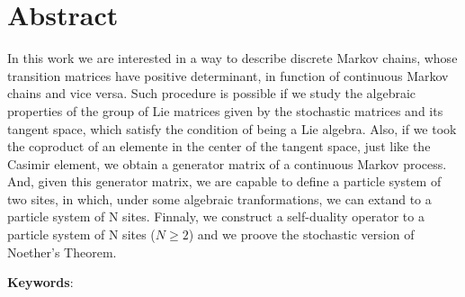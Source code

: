 \chapter*{ Abstract}
In this work we are interested in a way to describe discrete
Markov chains, whose transition matrices have positive determinant, in function of continuous Markov chains and vice versa.
Such procedure is possible if we study the algebraic properties of
the group of Lie matrices given by the stochastic matrices and its
tangent space, which satisfy the condition of being a Lie algebra.
Also, if we took the coproduct of an elemente in the center of 
the tangent space, just like the Casimir
element, we obtain a generator matrix of a continuous Markov process. And,
given this generator matrix, we are capable to define a particle system
of two sites, in which, under some algebraic tranformations,
we can extand to a particle system of N sites. Finnaly,
we construct a self-duality operator to a particle system of N sites ($N \geq 2$)
and we proove the stochastic version of Noether's Theorem.


\vspace{.5cm}
\textbf{Keywords}:\keywords

